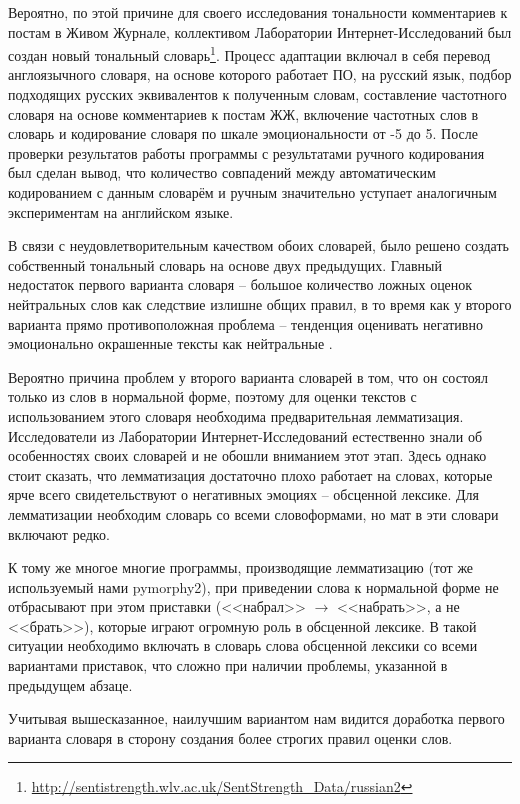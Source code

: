 Вероятно, по этой причине для своего исследования тональности комментариев к постам в Живом Журнале, коллективом Лаборатории Интернет-Исследований был создан новый тональный словарь\footnote{\href{http://sentistrength.wlv.ac.uk/SentStrength\_Data/russian2}{http://sentistrength.wlv.ac.uk/SentStrength\_Data/russian2}}\cite{hse_sentistrength}. Процесс адаптации включал в себя перевод англоязычного словаря, на основе которого работает ПО, на русский язык, подбор подходящих русских эквивалентов к полученным словам, составление частотного словаря на основе комментариев к постам ЖЖ, включение частотных слов в словарь и кодирование словаря по шкале эмоциональности от -5 до 5. После проверки результатов работы программы с результатами ручного кодирования был сделан вывод, что количество совпадений между автоматическим кодированием с данным словарём и ручным значительно уступает аналогичным экспериментам на английском языке.

В связи с неудовлетворительным качеством обоих словарей, было решено создать собственный тональный словарь на основе двух предыдущих. Главный недостаток первого варианта словаря -- большое количество ложных оценок нейтральных слов как следствие излишне общих правил, в то время как у второго варианта прямо противоположная проблема -- тенденция оценивать негативно эмоционально окрашенные тексты как нейтральные \cite[стр. 3]{hse_sentistrength}. 

Вероятно причина проблем у второго варианта словарей в том, что он состоял только из слов в нормальной форме, поэтому для оценки текстов с использованием этого словаря необходима предварительная лемматизация. Исследователи из Лаборатории Интернет-Исследований естественно знали об особенностях своих словарей и не обошли вниманием этот этап. Здесь однако стоит сказать, что лемматизация достаточно плохо работает на словах, которые ярче всего свидетельствуют о негативных эмоциях -- обсценной лексике. Для лемматизации необходим словарь со всеми словоформами, но мат в эти словари включают редко.

К тому же многое многие программы, производящие лемматизацию (тот же используемый нами pymorphy2), при приведении слова к нормальной форме не отбрасывают при этом приставки (<<набрал>> $\rightarrow$ <<набрать>>, а не <<брать>>), которые играют огромную роль в обсценной лексике. В такой ситуации необходимо включать в словарь слова обсценной лексики со всеми вариантами приставок, что сложно при наличии проблемы, указанной в предыдущем абзаце.


Учитывая вышесказанное, наилучшим вариантом нам видится доработка первого варианта словаря в сторону создания более строгих правил оценки слов.
\clearpage